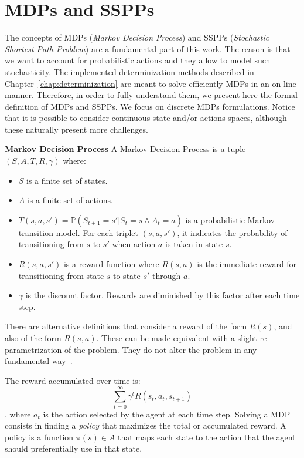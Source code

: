 \documentclass[../root.tex]{subfiles}
\begin{document}
\section{MDPs and SSPPs}

The concepts of MDPs (\emph{Markov Decision Process}) and SSPPs
(\emph{Stochastic Shortest Path Problem}) are a fundamental
part of this work. The reason is that we want to account for probabilistic
actions and they allow to model such stochasticity.
The implemented determinization methods described in
Chapter~\ref{chap:determinization} are meant to solve efficiently MDPs in an
on-line manner. Therefore, in order to fully understand them, we present
here the formal definition of MDPs and SSPPs. We focus on discrete MDPs
formulations. Notice that it is possible to consider continuous state
and/or actions spaces, although these naturally present more challenges.

\theoremstyle{definition}
\begin{definition}{\bfseries Markov Decision Process}
	A Markov Decision Process is a tuple $ (S, A, T, R, \gamma) $ where:
	\begin{itemize}
		\item $ S $ is a finite set of states.
		\item $ A $ is a finite set of actions.
		\item $ T(s,a,s') = \mathbb{P}(S_{t+1} = s' | S_t = s \land A_t=a) $ is
		a probabilistic Markov transition model. For each triplet
		$ (s, a, s') $, it indicates the probability of transitioning from $ s $
		to $ s' $ when action $ a $ is taken in state $ s $.
		\item $ R(s,a,s') $ is a reward function where $ R(s,a) $ is the immediate
		reward for transitioning from state $ s $ to state $ s' $ through $ a $.
		\item $ \gamma $ is the discount factor. Rewards are diminished
		by this factor after each time step.
	\end{itemize}
\end{definition}

There are alternative
definitions that consider a reward of the form $ R(s) $, and also of
the form $ R(s,a) $. These can be made
equivalent with a slight re-parametrization of the problem. They
do not alter the problem in any fundamental way~\cite{russell2016artificial}.

The reward accumulated over time is:
\[ \sum_{t=0}^\infty \gamma^t R(s_t, a_t, s_{t+1}) \],
where $ a_t $ is the action selected by the agent at each time step.
Solving a MDP consists in finding a \emph{policy} that maximizes the total or accumulated
reward. A policy is a function $ \pi (s) \in A $ that maps each state
to the action that the agent should preferentially use in that state.
\end{document}
